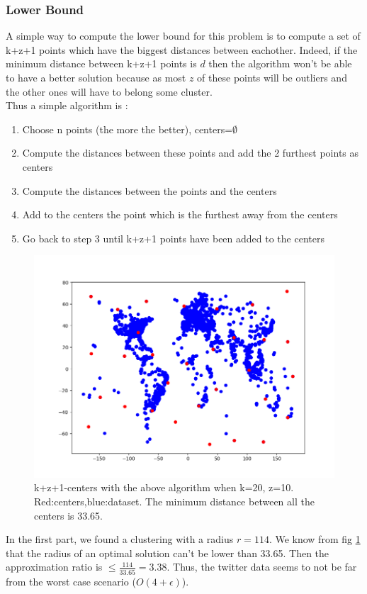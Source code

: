 \documentclass[a4paper,11pt,openany]{article}
\begin{document}
\subsubsection*{Lower Bound}
\noindent
A simple way to compute the lower bound for this problem is to compute a set of k+z+1 points which have the biggest distances between eachother. Indeed, if the minimum distance between k+z+1 points is $d$ then the algorithm won't be able to have a better solution because as most $z$ of these points will be outliers and the other ones will have to belong some cluster.\\
Thus a simple algorithm is :
\begin{enumerate}
\item Choose n points (the more the better), centers=$\emptyset$
\item Compute the distances between these points and add the 2 furthest points as centers
\item Compute the distances between the points and the centers
\item Add to the centers the point which is the furthest away from the centers
\item Go back to step 3 until k+z+1 points have been added to the centers
\end{enumerate}
\begin{figure}[H]
\begin{center}
\includegraphics[scale=0.5]{Images/lower_bound}
\caption{k+z+1-centers with the above algorithm when k=20, z=10. Red:centers,blue:dataset. The minimum distance between all the centers is 33.65.}
\label{fig:lower_bound}
\end{center}
\end{figure}
In the first part, we found a clustering with a radius $r=114$. We know from fig \ref{fig:lower_bound} that the radius of an optimal solution can't be lower than 33.65. Then the approximation ratio is $\leq \frac{114}{33.65}=3.38$. Thus, the twitter data seems to not be far from the worst case scenario ($O(4+\epsilon)$).
\end{document}
